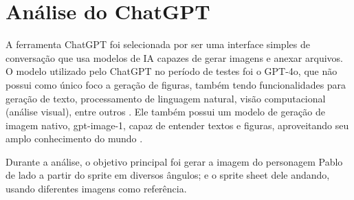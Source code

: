 \FloatBarrier
\section{Análise do ChatGPT}
\label{s.chatGPT}

A ferramenta ChatGPT foi selecionada por ser uma interface simples de conversação que usa modelos de IA capazes de gerar imagens e anexar arquivos. O modelo utilizado pelo ChatGPT no período de testes foi o GPT-4o, que não possui como único foco a geração de figuras, também tendo funcionalidades para geração de texto, processamento de linguagem natural, visão computacional (análise visual), entre outros \cite{openaiQuick_2025}. Ele também possui um modelo de geração de imagem nativo, gpt-image-1, capaz de entender textos e figuras, aproveitando seu amplo conhecimento do mundo \cite{openai_2025}. 

Durante a análise, o objetivo principal foi gerar a imagem do personagem Pablo de lado a partir do sprite em diversos ângulos; e o sprite sheet dele andando, usando diferentes imagens como referência. 

